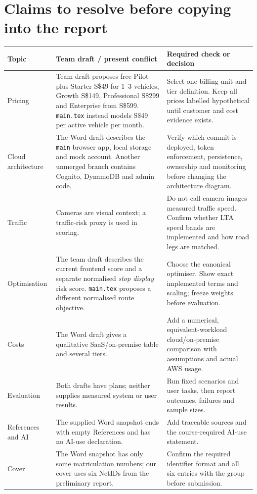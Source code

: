 \documentclass[11pt,a4paper]{article}
\begin{document}
\section{Claims to resolve before copying into the report}
\small
\begin{center}
\begin{tabular}{p{3.1cm}p{5.4cm}p{5.1cm}}
\toprule
Topic & Team draft / present conflict & Required check or decision \\
\midrule
Pricing & Team draft proposes free Pilot plus Starter S\$49 for 1--3 vehicles, Growth S\$149, Professional S\$299 and Enterprise from S\$599. \texttt{main.tex} instead models S\$49 per active vehicle per month. & Select one billing unit and tier definition. Keep all prices labelled hypothetical until customer and cost evidence exists. \\
Cloud architecture & The Word draft describes the \texttt{main} browser app, local storage and mock account. Another unmerged branch contains Cognito, DynamoDB and admin code. & Verify which commit is deployed, token enforcement, persistence, ownership and monitoring before changing the architecture diagram. \\
Traffic & Cameras are visual context; a traffic-risk proxy is used in scoring. & Do not call camera images measured traffic speed. Confirm whether LTA speed bands are implemented and how road legs are matched. \\
Optimisation & The team draft describes the current frontend score and a separate normalised \emph{stop display} risk score. \texttt{main.tex} proposes a different normalised route objective. & Choose the canonical optimiser. Show exact implemented terms and scaling; freeze weights before evaluation. \\
Costs & The Word draft gives a qualitative SaaS/on-premise table and several tiers. & Add a numerical, equivalent-workload cloud/on-premise comparison with assumptions and actual AWS usage. \\
Evaluation & Both drafts have plans; neither supplies measured system or user results. & Run fixed scenarios and user tasks, then report outcomes, failures and sample sizes. \\
References and AI & The supplied Word snapshot ends with empty References and has no AI-use declaration. & Add traceable sources and the course-required AI-use statement. \\
Cover & The Word snapshot has only some matriculation numbers; our cover uses six NetIDs from the preliminary report. & Confirm the required identifier format and all six entries with the group before submission. \\
\bottomrule
\end{tabular}
\end{center}
\normalsize
\end{document}
